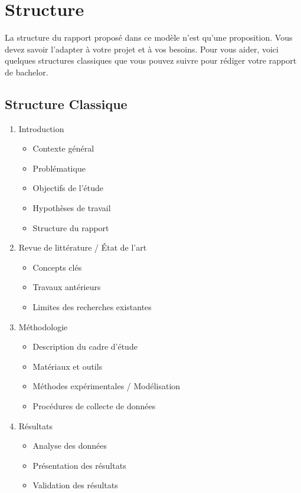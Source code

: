 \chapter{Structure}

La structure du rapport proposé dans ce modèle n'est qu'une proposition. Vous devez savoir l'adapter à votre projet et à vos besoins. Pour vous aider, voici quelques structures classiques que vous pouvez suivre pour rédiger votre rapport de bachelor.

\section{Structure Classique}

\begin{enumerate}
    \item Introduction
          \begin{itemize}
              \item Contexte général
              \item Problématique
              \item Objectifs de l'étude
              \item Hypothèses de travail
              \item Structure du rapport
          \end{itemize}

    \item Revue de littérature / État de l'art
          \begin{itemize}
              \item Concepts clés
              \item Travaux antérieurs
              \item Limites des recherches existantes
          \end{itemize}

    \item Méthodologie
          \begin{itemize}
              \item Description du cadre d'étude
              \item Matériaux et outils
              \item Méthodes expérimentales / Modélisation
              \item Procédures de collecte de données
          \end{itemize}

    \item Résultats
          \begin{itemize}
              \item Analyse des données
              \item Présentation des résultats
              \item Validation des résultats
          \end{itemize}


\end{enumerate}
